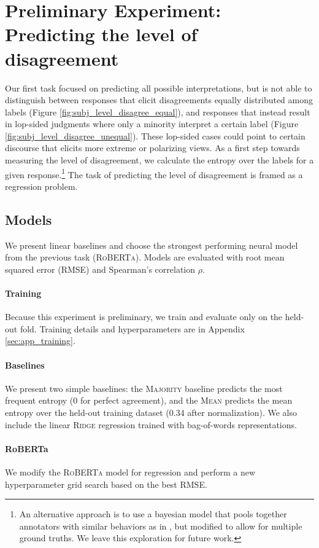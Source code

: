 \section{Preliminary Experiment: Predicting the level of disagreement}
Our first task focused on predicting all possible interpretations, but is not able to distinguish between responses that elicit disagreements equally distributed among labels (Figure \ref{fig:subj_level_disagree_equal}), and responses that instead result in lop-sided judgments where only a minority interpret a certain label (Figure \ref{fig:subj_level_disagree_unequal}). These lop-sided cases could point to certain discourse that elicits more extreme or polarizing views. As a first step towards measuring the level of disagreement, we calculate the entropy over the labels for a given response.\footnote{An alternative approach is to use a bayesian model that pools together annotators with similar behaviors as in , but modified to allow for multiple ground truths. We leave this exploration for future work.} The task of predicting the level of disagreement is framed as a regression problem.

\subsection{Models}
We present linear baselines and choose the strongest performing neural model from the previous task (\textsc{RoBERTa}). Models are evaluated with root mean squared error (RMSE) and Spearman's correlation $\rho$.

\paragraph{Training} Because this experiment is preliminary, we train and evaluate only on the held-out fold. Training details and hyperparameters are in Appendix \ref{sec:app_training}.

\paragraph{Baselines} We present two simple baselines: the \textsc{Majority} baseline predicts the most frequent entropy (0 for perfect agreement), and the \textsc{Mean} predicts the mean entropy over the held-out training dataset (0.34 after normalization). We also include the linear \textsc{Ridge} regression trained with bag-of-words representations.

\paragraph{RoBERTa} We modify the \textsc{RoBERTa} model for regression and perform a new hyperparameter grid search based on the best RMSE. 

